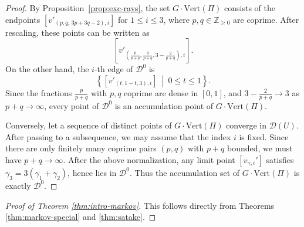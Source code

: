 \documentclass[reqno, 12pt]{amsart}
\theoremstyle{definition}
\newcommand{\bZ}{\mathbb{Z}}
\newcommand{\cD}{\mathcal{D}}
\newcommand{\VPi}{\mathrm{Vert}(\Pi)}
\numberwithin{equation}{section}
\begin{document}
\begin{proof}
By Proposition~\ref{prop:exc-rays}, the set $G\cdot\VPi$ consists of the endpoints
$[v'_{(p,q,\,3p+3q-2),i}]$ for $1\le i\le 3$,
where $p,q\in\bZ_{\geq 0}$ are coprime. After rescaling, these points can be written as
\[
\left[
v'_{\left(
\frac{p}{p+q},
\frac{q}{p+q},
3-\frac{2}{p+q}
\right),i}
\right].
\]
On the other hand, the $i$-th edge of $\cD^0$ is
\[
\left\{
\left[v'_{(t,1-t,3),i}\right]
\ \middle|\
0\leq t\leq 1
\right\}.
\]
Since the fractions $\frac{p}{p+q}$ with $p,q$ coprime are dense in
$[0,1]$, and $3-\frac{2}{p+q}\to 3$ as $p+q\to\infty$,
every point of $\cD^0$ is an accumulation point of $G\cdot\VPi$.

Conversely, let a sequence of distinct points of $G\cdot\VPi$
converge in $\cD(U)$. After passing to a subsequence, we may assume
that the index $i$ is fixed. Since there are only finitely many
coprime pairs $(p,q)$ with $p+q$ bounded, we must have
$p+q\to\infty$. After the above normalization, any limit point $[v_{\gamma,i}']$ satisfies $\gamma_3=3(\gamma_1+\gamma_2)$,
hence lies in $\cD^0$. Thus the accumulation set of
$G\cdot\VPi$ is exactly $\cD^0$.
\end{proof}


\begin{proof}[Proof of Theorem \ref{thm:intro-markov}]
This follows directly from Theorems \ref{thm:markov-special} and \ref{thm:satake}.
\end{proof}
\end{document}
